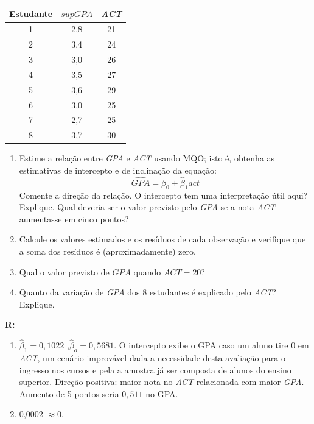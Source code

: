 \documentclass[12pt,letterpaper, onecolumn]{exam}
\renewenvironment{solution}
  {\par\noindent\textbf{R:}\enspace\color{blue}}
  {\par\color{black}}
\begin{document}
\begin{questions}
    \begin{table}[bhtp]
        \centering
        \begin{tabular}{c|cc}
            \toprule
            \midrule
            \multicolumn{1}{c}{Estudante} & $supGPA$  & \textit{ACT} \\
            \midrule
             1 & 2,8 & 21\\
             2 & 3,4 & 24\\
             3 & 3,0 & 26\\
             4 & 3,5 & 27\\
             5 & 3,6 & 29\\
             6 & 3,0 & 25\\
             7 & 2,7 & 25\\
             8 & 3,7 & 30\\
             \midrule
             \bottomrule
        \end{tabular}
    \end{table}
    \begin{enumerate} [label = (\alph*)]
        \item Estime a relação entre \textit{GPA} e \textit{ACT} usando MQO; isto é, obtenha as estimativas de intercepto e de inclinação da equação:\begin{equation*}
            \widehat{GPA} = \hat \beta_0 + \hat \beta_1 act
        \end{equation*} Comente a direção da relação. O intercepto tem uma interpretação útil aqui? Explique. Qual deveria ser o valor previsto pelo \textit{GPA} se a nota \textit{ACT} aumentasse em cinco pontos?
        \item Calcule os valores estimados e os resíduos de cada observação e verifique que a soma dos resíduos é (aproximadamente) zero.
        \item Qual o valor previsto de ${GPA}$ quando $ACT = 20$?
        \item Quanto da variação de \textit{GPA} dos 8 estudantes é explicado pelo \textit{ACT}? Explique.
    \end{enumerate}
\begin{solution}
    \begin{enumerate}[label = (\alph*)]
        \item $\hat\beta_1 = 0,1022$ ,$\hat\beta_o = 0,5681$. O intercepto exibe o GPA caso um aluno tire 0 em \textit{ACT}, um cenário improvável dada a necessidade desta avaliação para o ingresso nos cursos e pela a amostra já ser composta de alunos do ensino superior. Direção positiva: maior nota no \textit{ACT} relacionada com maior \textit{GPA}. Aumento de 5 pontos seria $0,511$ no GPA.
        \item 0,0002 $\approx 0$.


\end{enumerate}
\end{solution}
\end{questions}
\end{document}

